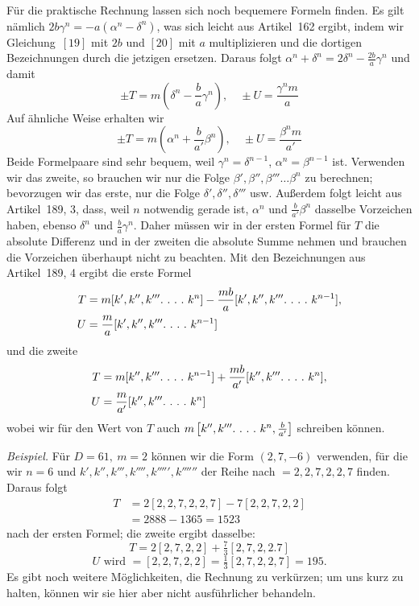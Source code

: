 Für die praktische Rechnung lassen sich noch bequemere Formeln finden. Es gilt nämlich \(2b\gamma^n=-a(\alpha^n-\delta^n)\), was sich leicht aus Artikel~162 ergibt, indem wir Gleichung~\([19]\) mit \(2b\) und \([20]\) mit \(a\) multiplizieren und die dortigen Bezeichnungen durch die jetzigen ersetzen. Daraus folgt \(\alpha^n+\delta^n=2\delta^n-\frac{2b}{a}\gamma^n\) und damit
\[
\pm T=m\left(\delta^n-\frac{b}{a}\gamma^n\right),\quad \pm U=\frac{\gamma^n m}{a}
\]
Auf ähnliche Weise erhalten wir
\[
\pm T=m\left(\alpha^n+\frac{b}{a'}\beta^n\right),\quad \pm U=\frac{\beta^n m}{a'}
\]
Beide Formelpaare sind sehr bequem, weil \(\gamma^n=\delta^{n-1}\), \(\alpha^n=\beta^{n-1}\) ist. Verwenden wir das zweite, so brauchen wir nur die Folge \(\beta',\beta'',\beta'''\ldots\beta^n\) zu berechnen; bevorzugen wir das erste, nur die Folge \(\delta',\delta'',\delta'''\) usw. Außerdem folgt leicht aus Artikel~189, 3, dass, weil \(n\) notwendig gerade ist, \(\alpha^n\) und \(\frac{b}{a'}\beta^n\) dasselbe Vorzeichen haben, ebenso \(\delta^n\) und \(\frac{b}{a}\gamma^n\). Daher müssen wir in der ersten Formel für \(T\) die absolute Differenz und in der zweiten die absolute Summe nehmen und brauchen die Vorzeichen überhaupt nicht zu beachten. Mit den Bezeichnungen aus Artikel~189, 4 ergibt die erste Formel
\[
\begin{aligned}T&=m[k',k'',k'''\ldotp\,\ldotp\,\ldotp\,\ldotp\, k^n]-\frac{mb}{a}[k',k'',k'''\ldotp\,\ldotp\,\ldotp\,\ldotp\, k^{n-1}],\\U&=\frac{m}{a}[k',k'',k'''\ldotp\,\ldotp\,\ldotp\,\ldotp\, k^{n-1}]\end{aligned}
\]
und die zweite
\[
\begin{aligned}T&=m[k'',k'''\ldotp\,\ldotp\,\ldotp\,\ldotp\, k^{n-1}]+\frac{mb}{a'}[k'',k'''\ldotp\,\ldotp\,\ldotp\,\ldotp\, k^n],\\U&=\frac{m}{a'}[k'',k'''\ldotp\,\ldotp\,\ldotp\,\ldotp\, k^n]\end{aligned}
\]
wobei wir für den Wert von \(T\) auch \(m\left[k'',k'''\ldotp\,\ldotp\,\ldotp\,\ldotp\, k^n,\frac{b}{a'}\right]\) schreiben können.

\textit{Beispiel.} Für \(D=61,\ m=2\) können wir die Form \((2,7,-6)\) verwenden, für die wir \(n=6\) und \(k',k'',k''',k'''',k''''',k''''''\) der Reihe nach \(=2,2,7,2,2,7\) finden. Daraus folgt
\[
\begin{aligned}T&=2[2,2,7,2,2,7]-7[2,2,7,2,2]\\&=2888-1365=1523\end{aligned}
\]
nach der ersten Formel; die zweite ergibt dasselbe:
\[
T=2[2,7,2,2]+\tfrac73[2,7,2,2.7]
\]
\[
U\text{ wird }=[2,2,7,2,2]=\tfrac13[2,7,2,2,7]=195.
\]
Es gibt noch weitere Möglichkeiten, die Rechnung zu verkürzen; um uns kurz zu halten, können wir sie hier aber nicht ausführlicher behandeln.

